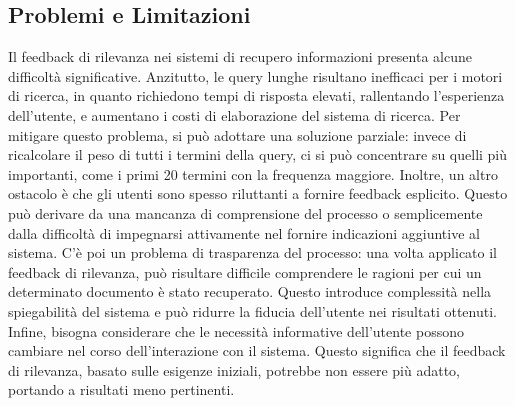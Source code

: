 \documentclass{report}
\begin{document}
	\subsection{Problemi e Limitazioni}
	Il feedback di rilevanza nei sistemi di recupero informazioni presenta alcune difficoltà significative. Anzitutto, le query lunghe risultano inefficaci per i motori di ricerca, in quanto richiedono tempi di risposta elevati, rallentando l'esperienza dell'utente, e aumentano i costi di elaborazione del sistema di ricerca. Per mitigare questo problema, si può adottare una soluzione parziale: invece di ricalcolare il peso di tutti i termini della query, ci si può concentrare su quelli più importanti, come i primi 20 termini con la frequenza maggiore. Inoltre, un altro ostacolo è che gli utenti sono spesso riluttanti a fornire feedback esplicito. Questo può derivare da una mancanza di comprensione del processo o semplicemente dalla difficoltà di impegnarsi attivamente nel fornire indicazioni aggiuntive al sistema. C'è poi un problema di trasparenza del processo: una volta applicato il feedback di rilevanza, può risultare difficile comprendere le ragioni per cui un determinato documento è stato recuperato. Questo introduce complessità nella spiegabilità del sistema e può ridurre la fiducia dell'utente nei risultati ottenuti. Infine, bisogna considerare che le necessità informative dell’utente possono cambiare nel corso dell'interazione con il sistema. Questo significa che il feedback di rilevanza, basato sulle esigenze iniziali, potrebbe non essere più adatto, portando a risultati meno pertinenti.
\end{document}
